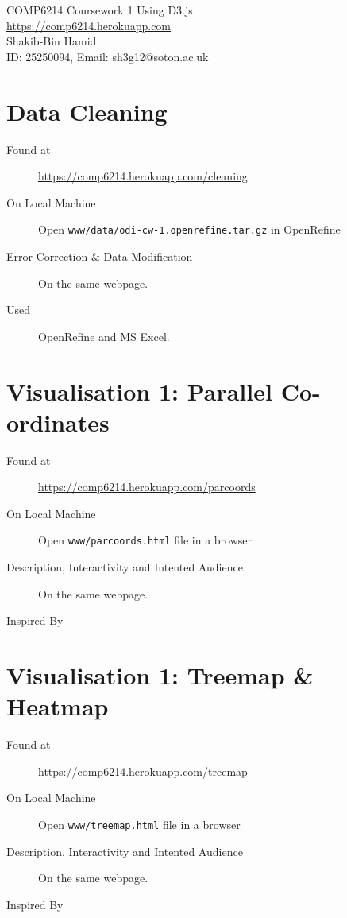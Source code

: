 \documentclass[10pt]{article}
\begin{document}
\begin{center}
\Large{
COMP6214 Coursework 1 Using D3.js\\
\url{https://comp6214.herokuapp.com}
}
\\
Shakib-Bin Hamid\\ID: 25250094, Email: sh3g12@soton.ac.uk

\end{center}

\section{Data Cleaning}

\begin{description}
\item[Found at ] \url{https://comp6214.herokuapp.com/cleaning}
\item[On Local Machine] Open \texttt{www/data/odi-cw-1.openrefine.tar.gz} in OpenRefine
\item[Error Correction \& Data Modification] On the same webpage.
\item[Used] OpenRefine\cite{openrefineteam} and MS Excel.
\end{description}

\section{Visualisation 1: Parallel Co-ordinates}

\begin{description}
\item[Found at ] \url{https://comp6214.herokuapp.com/parcoords}
\item[On Local Machine] Open \texttt{www/parcoords.html} file in a browser
\item[Description, Interactivity and Intented Audience] On the same webpage.
\item[Inspired By] \cite{kaichang}
\end{description}

\section{Visualisation 1: Treemap \& Heatmap}

\begin{description}
\item[Found at ] \url{https://comp6214.herokuapp.com/treemap}
\item[On Local Machine] Open \texttt{www/treemap.html} file in a browser
\item[Description, Interactivity and Intented Audience] On the same webpage.
\item[Inspired By] \cite{mikebostock}
\end{description}
\end{document}
